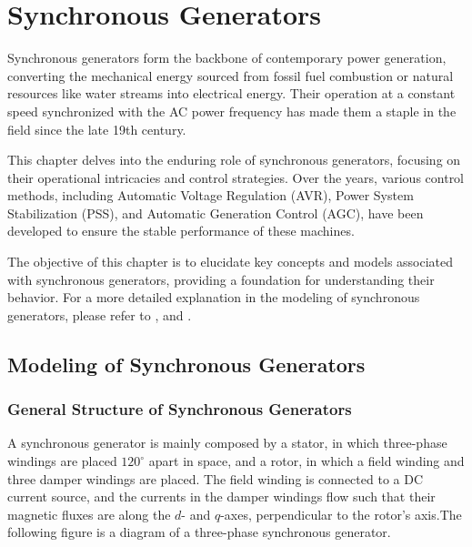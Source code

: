 
\chapter{Synchronous Generators} \label{chap:sg_modeling}

Synchronous generators form the backbone of contemporary power generation,
converting the mechanical energy sourced from fossil fuel combustion or natural
resources like water streams into electrical energy. Their operation at a
constant speed synchronized with the AC power frequency has made them a staple
in the field since the late 19th century.

This chapter delves into the enduring role of synchronous generators, focusing
on their operational intricacies and control strategies. Over the years, various
control methods, including Automatic Voltage Regulation (AVR), Power System
Stabilization (PSS), and Automatic Generation Control (AGC), have been developed
to ensure the stable performance of these machines.

The objective of this chapter is to elucidate key concepts and models associated
with synchronous generators, providing a foundation for understanding their
behavior. For a more detailed explanation in the modeling of synchronous generators,
please refer to \cite{sauer2017power},\cite{krause2002analysis} and \cite{siva2022modeling}.

\section{Modeling of Synchronous Generators}
\subsection{General Structure of Synchronous Generators}

A synchronous generator is mainly composed by a stator, in which three-phase
windings are placed $120^{\circ}$ apart in space, and a rotor, in which a field
winding and three damper windings are placed. The field winding is connected to
a DC current source, and the currents in the damper windings flow such that
their magnetic fluxes are along the $d$- and $q$-axes, perpendicular to the
rotor's axis.The following figure is a diagram of a three-phase synchronous
generator.


